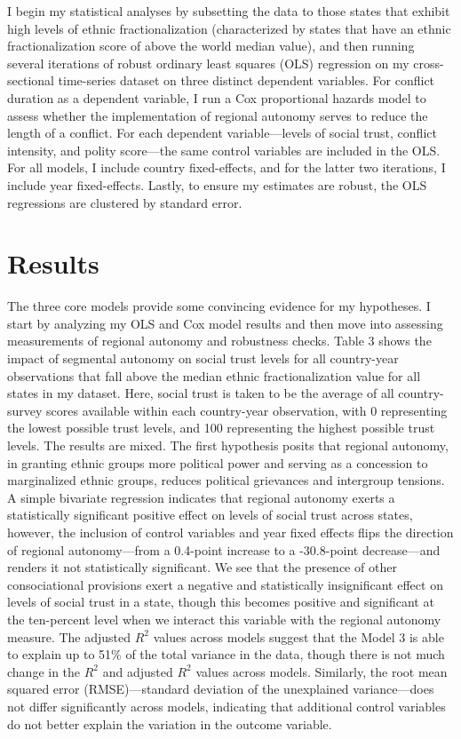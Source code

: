\documentclass[12pt]{article}
\begin{document}
I begin my statistical analyses by subsetting the data to those states that exhibit high levels of ethnic fractionalization (characterized by states that have an ethnic fractionalization score of above the world median value), and then running several iterations of robust ordinary least squares (OLS) regression on my cross-sectional time-series dataset on three distinct dependent variables. For conflict duration as a dependent variable, I run a Cox proportional hazards model to assess whether the implementation of regional autonomy serves to reduce the length of a conflict. For each dependent variable---levels of social trust, conflict intensity, and polity score---the same control variables are included in the OLS. For all models, I include country fixed-effects, and for the latter two iterations, I include year fixed-effects. Lastly, to ensure my estimates are robust, the OLS regressions are clustered by standard error.  

\section{Results}
The three core models provide some convincing evidence for my hypotheses. I start by analyzing my OLS and Cox model results and then move into assessing measurements of regional autonomy and robustness checks. Table 3 shows the impact of segmental autonomy on social trust levels for all country-year observations that fall above the median ethnic fractionalization value for all states in my dataset. Here, social trust is taken to be the average of all country-survey scores available within each country-year observation, with 0 representing the lowest possible trust levels, and 100 representing the highest possible trust levels. The results are mixed. The first hypothesis posits that regional autonomy, in granting ethnic groups more political power and serving as a concession to marginalized ethnic groups, reduces political grievances and intergroup tensions. A simple bivariate regression indicates that regional autonomy exerts a statistically significant positive effect on levels of social trust across states, however, the inclusion of control variables and year fixed effects flips the direction of regional autonomy---from a 0.4-point increase to a -30.8-point decrease---and renders it not statistically significant. We see that the presence of other consociational provisions exert a negative and statistically insignificant effect on levels of social trust in a state, though this becomes positive and significant at the ten-percent level when we interact this variable with the regional autonomy measure. The adjusted $R^2$ values across models suggest that the Model 3 is able to explain up to 51\% of the total variance in the data, though there is not much change in the $R^2$ and adjusted $R^2$ values across models. Similarly, the root mean squared error (RMSE)---standard deviation of the unexplained variance---does not differ significantly across models, indicating that additional control variables do not better explain the variation in the outcome variable.  
\end{document}
